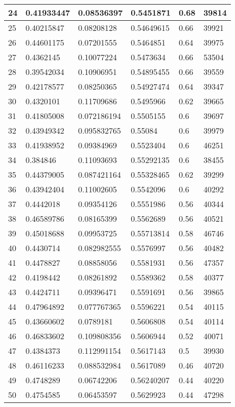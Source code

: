 \begin{longtable}{|l|l|l|l|l|l|}
24 & 0.41933447 & 0.08536397 & 0.5451871 & 0.68 & 39814 \\ \hline 
25 & 0.40215847 & 0.08208128 & 0.54649615 & 0.66 & 39921 \\ \hline 
26 & 0.44601175 & 0.07201555 & 0.5464851 & 0.64 & 39975 \\ \hline 
27 & 0.4362145 & 0.10077224 & 0.5473634 & 0.66 & 53504 \\ \hline 
28 & 0.39542034 & 0.10906951 & 0.54895455 & 0.66 & 39559 \\ \hline 
29 & 0.42178577 & 0.08250365 & 0.54927474 & 0.64 & 39347 \\ \hline 
30 & 0.4320101 & 0.11709686 & 0.5495966 & 0.62 & 39665 \\ \hline 
31 & 0.41805008 & 0.072186194 & 0.5505155 & 0.6 & 39697 \\ \hline 
32 & 0.43949342 & 0.095832765 & 0.55084 & 0.6 & 39979 \\ \hline 
33 & 0.41938952 & 0.09384969 & 0.5523404 & 0.6 & 46251 \\ \hline 
34 & 0.384846 & 0.11093693 & 0.55292135 & 0.6 & 38455 \\ \hline 
35 & 0.44379005 & 0.087421164 & 0.55328465 & 0.62 & 39299 \\ \hline 
36 & 0.43942404 & 0.11002605 & 0.5542096 & 0.6 & 40292 \\ \hline 
37 & 0.4442018 & 0.09354126 & 0.5551986 & 0.56 & 40344 \\ \hline 
38 & 0.46589786 & 0.08165399 & 0.5562689 & 0.56 & 40521 \\ \hline 
39 & 0.45018688 & 0.09953725 & 0.55713814 & 0.58 & 46746 \\ \hline 
40 & 0.4430714 & 0.082982555 & 0.5576997 & 0.56 & 40482 \\ \hline 
41 & 0.4478827 & 0.08858056 & 0.5581931 & 0.56 & 47357 \\ \hline 
42 & 0.4198442 & 0.08261892 & 0.5589362 & 0.58 & 40377 \\ \hline 
43 & 0.4424711 & 0.09396471 & 0.5591691 & 0.56 & 39865 \\ \hline 
44 & 0.47964892 & 0.077767365 & 0.5596221 & 0.54 & 40115 \\ \hline 
45 & 0.43660602 & 0.0789181 & 0.5606808 & 0.54 & 40114 \\ \hline 
46 & 0.46833602 & 0.109808356 & 0.5606944 & 0.52 & 40071 \\ \hline 
47 & 0.4384373 & 0.112991154 & 0.5617143 & 0.5 & 39930 \\ \hline 
48 & 0.46116233 & 0.088532984 & 0.5617089 & 0.46 & 40720 \\ \hline 
49 & 0.4748289 & 0.06742206 & 0.56240207 & 0.44 & 40220 \\ \hline 
50 & 0.4754585 & 0.06453597 & 0.5629923 & 0.44 & 47298 \\ \hline 
\end{longtable}
